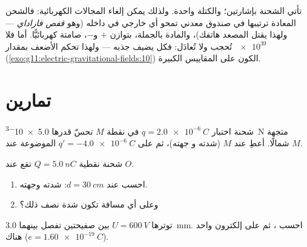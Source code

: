 \begin{remark}\label{rem:g11:electric-gravitational-fields:noanalogue}
تأتي الشحنة بإشارتين؛ والكتلة  واحدة. ولذلك يمكن إلغاء
المجالات الكهربائية: فالشحن المعادة ترتيبها في صندوق معدني تمحو أي 
خارجي في داخله (وهو \emph{قفص فاراداي} --- ولهذا يقتل المصعد 
هاتفك)، والمادة بالجملة، بتوازن $+$ و$-$، صامتة
كهربائيًّا. أما  فلا تُحجب ولا تُعادَل:
فكل  يضيف جذبه --- ولهذا تحكم  الأضعف بمقدار
$\num{e39}$ (\cref{exo:g11:electric-gravitational-fields:10})
الكون على المقاييس الكبيرة.
\end{remark}

\section{تمارين}

\begin{exercise}[$\star$]\label{exo:g11:electric-gravitational-fields:1}
شحنة اختبار $q = \qty{+2.0e-6}{C}$ في نقطة $M$ تحسّ  قدرها
\qty{5.0e-3}{N} متجهة شمالًا. أعطِ  عند $M$ (شدته و
جهته)، ثم  على $q' = \qty{-4.0e-6}{C}$ الموضوعة عند $M$.
\end{exercise}

\begin{exercise}[$\star$]\label{exo:g11:electric-gravitational-fields:2}
شحنة نقطية $Q = \qty{+5.0}{nC}$ تقع عند $O$.
\begin{enumerate}
  \item احسب  عند $d = \qty{30}{cm}$: شدته وجهته.
  \item وعلى أي مسافة تكون شدة  نصف ذلك؟
\end{enumerate}
\end{exercise}

\begin{exercise}[$\star$]\label{exo:g11:electric-gravitational-fields:3}
 توترها $U = \qty{600}{V}$ بين صفيحتين تفصل بينهما \qty{3.0}{mm}.
احسب ، ثم  على إلكترون واحد هناك
($e = \qty{1.60e-19}{C}$).
\end{exercise}

